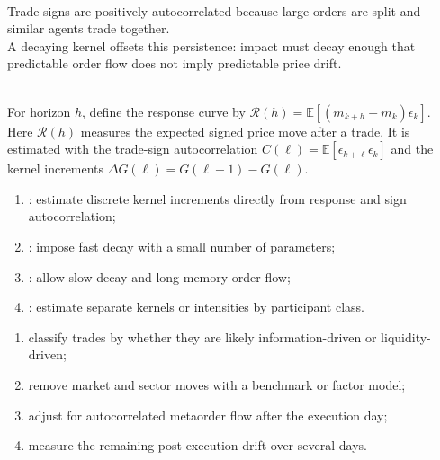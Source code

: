 \begin{mechanism} \\
Trade signs are positively autocorrelated because large orders are split and similar agents trade together.\\
A decaying kernel offsets this persistence: impact must decay enough that predictable order flow does not imply predictable price drift.
\end{mechanism}

\begin{model} \\
For horizon $h$, define the response curve by $\mathcal{R}(h)=\mathbb{E}[(m_{k+h}-m_k)\epsilon_k]$.\\
Here $\mathcal{R}(h)$ measures the expected signed price move after a trade. It is estimated with the trade-sign autocorrelation $C(\ell)=\mathbb{E}[\epsilon_{k+\ell}\epsilon_k]$ and the kernel increments $\Delta G(\ell)=G(\ell+1)-G(\ell)$.
\end{model}

\begin{taxonomy} 
\begin{enumerate}[label=\roman*.]
\setlength{\itemsep}{0pt}
\item {}: estimate discrete kernel increments directly from response and sign autocorrelation;
\item {}: impose fast decay with a small number of parameters;
\item {}: allow slow decay and long-memory order flow;
\item {}: estimate separate kernels or intensities by participant class.
\end{enumerate}
\end{taxonomy}

\begin{process} 
\begin{enumerate}[label=\roman*.]
\setlength{\itemsep}{0pt}
\item classify trades by whether they are likely information-driven or liquidity-driven;
\item remove market and sector moves with a benchmark or factor model;
\item adjust for autocorrelated metaorder flow after the execution day;
\item measure the remaining post-execution drift over several days.
\end{enumerate}
\end{process}

